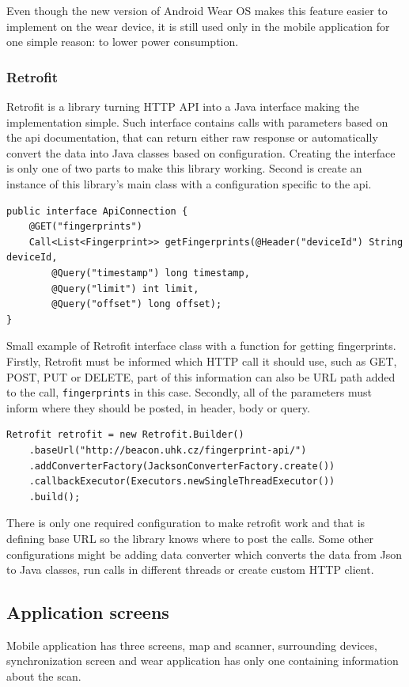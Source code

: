 Even though the new version of Android Wear OS makes this feature easier to implement on the wear device, it is still used only in the mobile application for one simple reason: to lower power consumption. 

\subsubsection{Retrofit}\label{subsec:Retrofit}
Retrofit is a library turning HTTP API into a Java interface making the implementation simple. Such interface contains calls with parameters based on the api documentation, that can return either raw response or automatically convert the data into Java classes based on configuration. Creating the interface is only one of two parts to make this library working. Second is create an instance of this library's main class with a configuration specific to the api.

\begin{lstlisting}[caption=Retrofit interface example.]
public interface ApiConnection {
	@GET("fingerprints")
	Call<List<Fingerprint>> getFingerprints(@Header("deviceId") String deviceId,
		@Query("timestamp") long timestamp,
		@Query("limit") int limit,
		@Query("offset") long offset);
}
\end{lstlisting}

Small example of Retrofit interface class with a function for getting fingerprints. Firstly, Retrofit must be informed which HTTP call it should use, such as GET, POST, PUT or DELETE, part of this information can also be URL path added to the call, \verb|fingerprints| in this case. Secondly, all of the parameters must inform 
where they should be posted, in header, body or query.

\begin{lstlisting}[caption=Retrofit configuration example.]
Retrofit retrofit = new Retrofit.Builder()
	.baseUrl("http://beacon.uhk.cz/fingerprint-api/")
	.addConverterFactory(JacksonConverterFactory.create())
	.callbackExecutor(Executors.newSingleThreadExecutor())
	.build();
\end{lstlisting}

There is only one required configuration to make retrofit work and that is defining base URL so the library knows where to post the calls. Some other configurations might be adding data converter which converts the data from Json to Java classes, run calls in different threads or create custom HTTP client.

\subsection{Application screens}\label{subsec:ApplicationScreens}
Mobile application has three screens, map and scanner, surrounding devices, synchronization screen and wear application has only one containing information about the scan.


